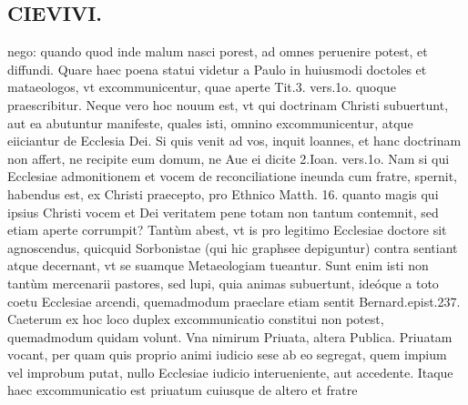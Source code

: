 \documentclass{article}
\begin{document}
\begin{pages}
\section*{CIEVIVI. }
\marginpar{[ p.431 ]}\pstart nego: quando quod inde malum nasci porest, ad omnes peruenire potest, et diffundi. Quare haec poena statui videtur a Paulo in huiusmodi doctoles et mataeologos, vt excommunicentur, quae aperte Tit.3. vers.1o. quoque praescribitur.  \pend\pstart Neque vero hoc nouum est, vt qui doctrinam Christi subuertunt, aut ea abutuntur manifeste, quales isti, omnino excommunicentur, atque eiiciantur de Ecclesia Dei. Si quis venit ad vos, inquit loannes, et hanc doctrinam non affert, ne recipite eum domum, ne Aue ei dicite 2.Ioan. vers.1o. Nam si qui Ecclesiae admonitionem et vocem de reconciliatione ineunda cum fratre, spernit, habendus est, ex Christi praecepto, pro Ethnico Matth. 16. quanto magis qui ipsius Christi vocem et Dei veritatem pene totam non tantum contemnit, sed etiam aperte corrumpit? Tantùm abest, vt is pro legitimo Ecclesiae doctore sit agnoscendus, quicquid Sorbonistae (qui hic graphsee depiguntur) contra sentiant atque decernant, vt se suamque Metaeologiam tueantur. Sunt enim isti non tantùm mercenarii pastores, sed lupi, quia animas subuertunt, ideóque a toto coetu Ecclesiae arcendi, quemadmodum praeclare etiam sentit Bernard.epist.237.  \pend\pstart Caeterum ex hoc loco duplex excommunicatio constitui non potest, quemadmodum quidam volunt. Vna nimirum Priuata, altera Publica.  \pend\pstart Priuatam vocant, per quam quis proprio animi iudicio sese ab eo segregat, quem impium vel improbum putat, nullo Ecclesiae iudicio interueniente, aut accedente. Itaque haec excommunicatio est priuatum cuiusque de altero et fratre  \pend

\end{pages}
\end{document}
